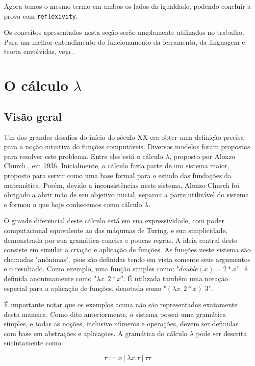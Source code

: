 Agora temos o mesmo termo em ambos os lados da igualdade, podendo concluir a
prova com \texttt{reflexivity}.

Os conceitos apresentados nesta seção serão amplamente utilizados no trabalho.
Para um melhor entendimento do funcionamento da ferramenta, da linguagem e
teoria envolvidas, veja \cite{pierce}.


\section{O cálculo $\lambda$}

\subsection{Visão geral}

Um dos grandes desafios do início do século XX era obter uma definição 
precisa para a noção intuitiva do funções computáveis. Diversos modelos foram
propostos para resolver este problema. Entre eles está o cálculo $\lambda$,
proposto por Alonzo Church \cite{lambda_first}, em 1936. Inicialmente, o cálculo
fazia parte de um sistema maior, proposto para servir como uma base
formal para o estudo das fundações da matemática. Porém, devido a
inconsistências neste sistema, Alonzo Church foi obrigado a abrir mão de seu
objetivo inicial, separou a parte utilizável do sistema e formou o que hoje
conhecemos como cálculo $\lambda$.

O grande diferencial deste cálculo está em sua expressividade, com poder
computacional equivalente ao das máquinas de Turing, e sua simplicidade,
demonstrada por sua gramática concisa e poucas regras. A ideia central deste
consiste em simular a criação e aplicação de funções. As funções neste sistema
são chamadas "anônimas", pois são definidas tendo em vista somente seus
argumentos e o resultado. Como exemplo, uma função simples como: "$double(x) =
2*x$" \ é definida anonimamente como "$\lambda x.\ 2*x$". É utilizada também uma
notação especial para a aplicação de funções, denotada como "$ (\lambda x.\
2*x)$  $3$".

É importante notar que os exemplos acima não são representados exatamente desta
maneira. Como dito anteriormente, o sistema possui uma gramática simples, e
todas as noções, inclusive números e operações, devem ser definidas com base em
abstrações e aplicações. A gramática do cálculo $\lambda$ pode ser descrita
sucintamente como:

\[ \tau := x\ |\ \lambda x.\tau\ |\ \tau \tau \]

